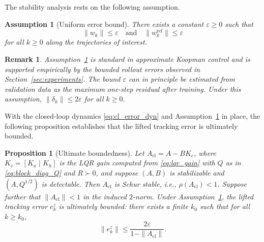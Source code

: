 \documentclass[journal]{IEEEtran}
\newtheorem{assumption}{Assumption}
\newtheorem{proposition}{Proposition}
\newtheorem{remark}{Remark}
\begin{document}
The stability analysis rests on the following assumption.

\begin{assumption}[Uniform error bound]
\label{assump:bound}
There exists a constant $\varepsilon \geq 0$ such that
\begin{equation}
    \|w_k\| \leq \varepsilon \quad \text{and} \quad \|w_k^{\mathrm{ref}}\| \leq \varepsilon
    \label{eq:error_bound}
\end{equation}
for all $k \geq 0$ along the trajectories of interest.
\end{assumption}

\begin{remark}
Assumption~\ref{assump:bound} is standard in approximate Koopman control \cite{strasser2026overview} and is supported empirically by the bounded rollout errors observed in Section~\ref{sec:experiments}. The bound $\varepsilon$ can in principle be estimated from validation data as the maximum one-step residual after training. Under this assumption, $\|\delta_k\| \leq 2\varepsilon$ for all $k \geq 0$.
\end{remark}

With the closed-loop dynamics \eqref{eq:cl_error_dyn} and Assumption~\ref{assump:bound} in place, the following proposition establishes that the lifted tracking error is ultimately bounded.

\begin{proposition}[Ultimate boundedness]
\label{prop:ub}
Let $A_{\mathrm{cl}} = A - BK_c$, where $K_c = [K_x\;|\;K_h]$ is the LQR gain computed from \eqref{eq:lqr_gain} with $Q$ as in \eqref{eq:block_diag_Q} and $R \succ 0$, and suppose $(A,B)$ is stabilizable and $(A,Q^{1/2})$ is detectable. Then $A_{\mathrm{cl}}$ is Schur stable, i.e., $\rho(A_{\mathrm{cl}}) < 1$. Suppose further that $\|A_{\mathrm{cl}}\| < 1$ in the induced $2$-norm. Under Assumption~\ref{assump:bound}, the lifted tracking error $e_k^z$ is ultimately bounded: there exists a finite $k_0$ such that for all $k \geq k_0$,
\begin{equation}
    \|e_k^z\| \leq \frac{2\varepsilon}{1 - \|A_{\mathrm{cl}}\|}.
    \label{eq:ub_bound}
\end{equation}
\end{proposition}
\end{document}

